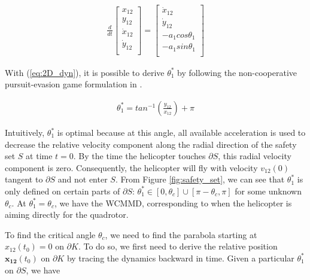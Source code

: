 \documentclass[journal,11pt,onecolumn,draftclsnofoot,]{IEEEtran}
\begin{document}
\begin{equation}
\label{eq:2D_dyn}
\begin{split}
\frac{d}{dt}
\begin{bmatrix}
x_{12} \\
y_{12} \\
\dot{x}_{12} \\
\dot{y}_{12} \\
\end{bmatrix}
=
\begin{bmatrix}
\dot{x}_{12} \\
\dot{y}_{12} \\
-a_1 cos \theta_1 \\
-a_1 sin \theta_1 \\
\end{bmatrix}
\end{split}
\end{equation}

With (\ref{eq:2D_dyn}), it is possible to derive $\theta_1^*$ by following the non-cooperative pursuit-evasion game formulation in \cite{hoffmann2008decentralized}.

\begin{equation}
\label{eq:theta_1^*}
\begin{split}
\theta_1^* = tan^{-1}\left( \frac{y_{12}}{x_{12}} \right) + \pi
\end{split}
\end{equation}

Intuitively, $\theta_1^*$ is optimal because at this angle, all available acceleration is used to decrease the relative velocity component along the radial direction of the safety set $S$ at time $t=0$. By the time the helicopter touches $\partial S$, this radial velocity component is zero. Consequently, the helicopter will fly with velocity $v_{12}(0)$ tangent to $\partial S$ and not enter $S$.
From Figure \ref{fig:safety_set}, we can see that $\theta_1^*$ is only defined on certain parts of $\partial S$: $\theta_1^*\in[0,\theta_c] \cup [\pi-\theta_c,\pi]$ for some unknown $\theta_c$. At $\theta_1^*=\theta_c$, we have the WCMMD, corresponding to when the helicopter is aiming directly for the quadrotor.

To find the critical angle $\theta_c$, we need to find the parabola starting at $x_{12}(t_0)=0$ on $\partial K$. To do so, we first need to derive the relative position $\boldsymbol{x_{12}}(t_0)$ on $\partial K$ by tracing the dynamics backward in time. Given a particular $\theta_1^*$ on $\partial S$,  we have
\end{document}
